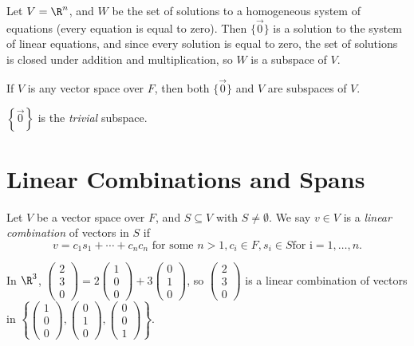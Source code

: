 \documentclass[12pt]{article}
\begin{document}
\begin{exmp}
    Let $V =\R^n$, and $W$ be the set of solutions to a homogeneous system of equations (every equation is equal to zero). Then $\{\vec{0}\}$ is a solution to the system of linear equations, and since every solution is equal to zero, the set of solutions is closed under addition and multiplication, so $W$ is a subspace of $V$.
\end{exmp}

\begin{exmp}
    If $V$ is any vector space over $F$, then both $\{\vec{0}\}$ and $V$ are subspaces of $V$.
\end{exmp}

\begin{defn}
    $\left\{\vec{0}\right\}$ is the \emph{trivial} subspace.
\end{defn}

\section{Linear Combinations and Spans}

\begin{defn}
    Let $V$ be a vector space over $F$, and $S \subseteq V$ with $S \neq \emptyset$. We say $v \in V$ is a \emph{linear combination} of vectors in $S$ if \[v = c_1s_1 + \cdots + c_nc_n \textrm{ for some } n >1, c_i \in F, s_i \in S \textrm{for i} = 1,\ldots,n.\]
\end{defn}

\begin{exmp}
    In $\R^3$, $\begin{pmatrix}
            2 \\ 3 \\ 0
        \end{pmatrix} = 2\begin{pmatrix}
            1 \\ 0 \\ 0
        \end{pmatrix} + 3\begin{pmatrix}
            0 \\ 1 \\ 0
        \end{pmatrix}$, so $\begin{pmatrix}
            2 \\ 3 \\ 0
        \end{pmatrix}$ is a linear combination of vectors in $\left\{\begin{pmatrix}
            1 \\ 0 \\ 0
        \end{pmatrix},\begin{pmatrix}
            0 \\ 1 \\ 0
        \end{pmatrix},\begin{pmatrix}
            0 \\ 0 \\ 1
        \end{pmatrix}\right\}$.
\end{exmp}
\end{document}
